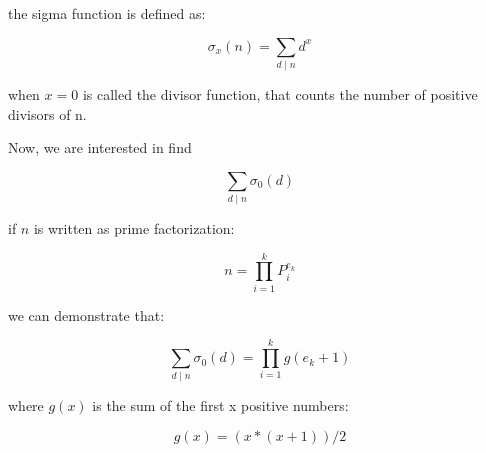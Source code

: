 \documentclass{article}
\begin{document}
  the sigma function is defined as:

  $$
    \sigma_x(n)=\sum_{d\mid n} d^x
  $$

  when $x = 0$ is called the divisor function, that counts the number
  of positive divisors of n.


  Now, we are interested in find


  $$
    \sum_{d\mid n} \sigma_0(d)
  $$

  if $n$ is written as prime factorization:

  $$
    n = \prod_{i = 1}^{k} P_{i}^{e_k}
  $$

  we can demonstrate that:

  $$
    \sum_{d\mid n} \sigma_0(d) = \prod_{i = 1}^{k} g(e_k + 1)
  $$

  where $g(x)$ is the sum of the first x positive numbers:

  $$
    g(x) = (x * (x + 1)) / 2
  $$
\end{document}
